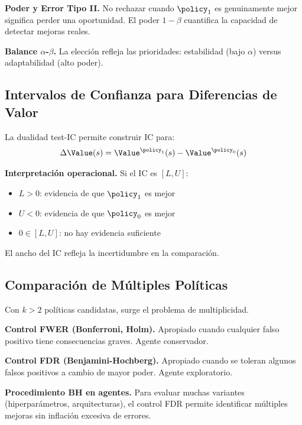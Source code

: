 \textbf{Poder y Error Tipo II.} No rechazar cuando $\policy_1$ es
genuinamente mejor significa perder una oportunidad. El poder $1-\beta$
cuantifica la capacidad de detectar mejoras reales.

\textbf{Balance $\alpha$-$\beta$.} La elección refleja las prioridades:
estabilidad (bajo $\alpha$) versus adaptabilidad (alto poder).

\subsection{Intervalos de Confianza para Diferencias de Valor}
\label{sec:ch4-ic-delta}

La dualidad test-IC permite construir IC para:
\[
	\Delta \Value(s) = \Value^{\policy_1}(s) - \Value^{\policy_0}(s)
\]

\textbf{Interpretación operacional.} Si el IC es $[L, U]$:
\begin{itemize}
	\item $L > 0$: evidencia de que $\policy_1$ es mejor
	\item $U < 0$: evidencia de que $\policy_0$ es mejor
	\item $0 \in [L, U]$: no hay evidencia suficiente
\end{itemize}

El ancho del IC refleja la incertidumbre en la comparación.

\subsection{Comparación de Múltiples Políticas}
\label{sec:ch4-multiples-politicas}

Con $k > 2$ políticas candidatas, surge el problema de multiplicidad.

\textbf{Control FWER (Bonferroni, Holm).} Apropiado cuando cualquier
falso positivo tiene consecuencias graves. Agente conservador.

\textbf{Control FDR (Benjamini-Hochberg).} Apropiado cuando se toleran
algunos falsos positivos a cambio de mayor poder. Agente exploratorio.

\textbf{Procedimiento BH en agentes.} Para evaluar muchas variantes
(hiperparámetros, arquitecturas), el control FDR permite identificar
múltiples mejoras sin inflación excesiva de errores.

